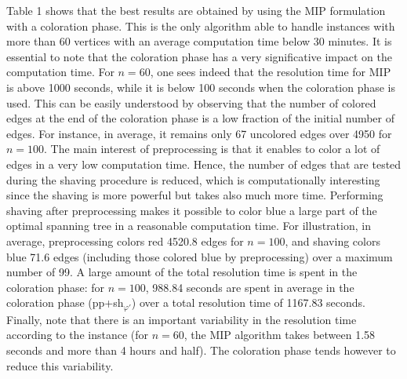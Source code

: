 \documentclass[final,3p,times]{elsarticle}
\begin{document}
Table 1 shows that the best results are obtained by using the MIP formulation with a coloration phase. This is the only algorithm able to handle instances with more than 60 vertices with an average computation time below 30 minutes. It is essential to note that the coloration phase has a very significative impact on the computation time. For $n= 60$, one sees indeed that the resolution time for MIP is above 1000 seconds, while it is below 100 seconds when the coloration phase is used. This can be easily understood by observing that the number of colored edges at the end of the coloration phase is a low fraction of the initial number of edges. For instance, in average, it remains only 67 uncolored edges over 4950 for $n=100$. The main interest of preprocessing is that it enables to color a lot of edges in a very low computation time. Hence, the number of edges that are tested during the shaving procedure is reduced, which is computationally interesting since the shaving is more powerful but takes also much more time. Performing shaving after preprocessing makes it possible to color blue a large part of the optimal spanning tree in a reasonable computation time.  For illustration, in average,  preprocessing colors red 4520.8 edges for $n=100$, and shaving colors blue 71.6 edges (including those colored blue by preprocessing) over a maximum number of 99. A large amount of the total resolution time is spent in the coloration phase: for $n=100$, 988.84 seconds are spent in average in the coloration phase (pp+sh$_{\varphi'}$) over a total resolution time of 1167.83 seconds. Finally, note that there is an important variability in the resolution time according to the instance (for $n=60$, the MIP algorithm takes between 1.58 seconds and more than 4 hours and half). The coloration phase tends however to reduce this variability.
\end{document}
